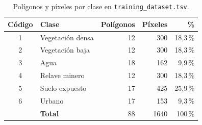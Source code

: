 \begin{table}[htbp]
 \centering
 \caption{Polígonos y píxeles por clase en \texttt{training\_dataset.tsv}.}
 \label{tab:conteo}
 \begin{tabular}{clrrr}
  \toprule
  Código & Clase & Polígonos & Píxeles & \% \\
  \midrule
  1 & Vegetación densa & 12 & 300 & 18{,}3\,\% \\
  2 & Vegetación baja & 12 & 300 & 18{,}3\,\% \\
  3 & Agua & 18 & 162 & 9{,}9\,\% \\
  4 & Relave minero & 12 & 300 & 18{,}3\,\% \\
  5 & Suelo expuesto & 17 & 425 & 25{,}9\,\% \\
  6 & Urbano & 17 & 153 & 9{,}3\,\% \\
  \midrule
   & \textbf{Total} & 88 & 1640 & 100\,\% \\
  \bottomrule
 \end{tabular}
\end{table}
